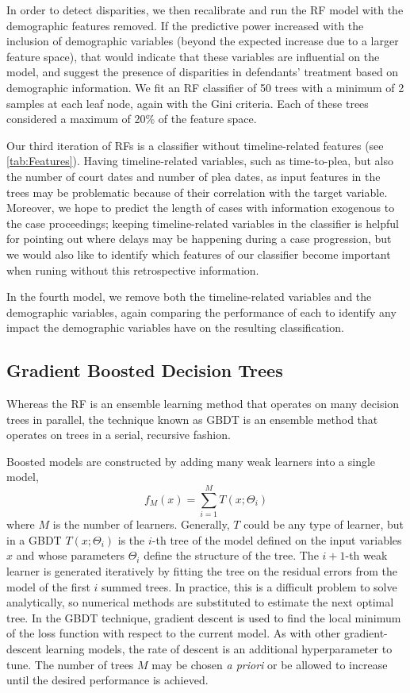 \documentclass{AISB2008}
\begin{document}
In order to detect disparities, we then recalibrate and run the RF
model with the demographic features removed. If the predictive power
increased with the inclusion of demographic variables (beyond the
expected increase due to a larger feature space), that would indicate
that these variables are influential on the model, and suggest the
presence of disparities in defendants' treatment based on demographic
information. We fit an RF classifier of 50 trees with a minimum of 2
samples at each leaf node, again with the Gini criteria. Each of these
trees considered a maximum of 20\% of the feature space.

Our third iteration of RFs is a classifier without timeline-related
features (see \autoref{tab:Features}). Having timeline-related
variables, such as time-to-plea, but also the number of court dates and
number of plea dates, as input features in the trees may be
problematic because of their correlation with the target
variable. Moreover, we hope to predict the length of cases with
information exogenous to the case proceedings; keeping
timeline-related variables in the classifier is helpful for pointing
out where delays may be happening during a case progression, but we
would also like to identify which features of our classifier become
important when runing without this retrospective information.

In the fourth model, we remove both the timeline-related variables and the
demographic variables, again comparing the performance of each to
identify any impact the demographic variables have on the resulting
classification.



\subsection{Gradient Boosted Decision Trees}

Whereas the RF is an ensemble learning method that operates on many
decision trees in parallel, the technique known as GBDT is an ensemble
method that operates on trees in a serial, recursive fashion.

Boosted models are constructed by adding many weak learners into a
single model, $$f_{M}(x) = \sum_{i=1}^{M}{T(x;\Theta_{i})}$$ where $M$
is the number of learners.  Generally, $T$ could be any type of
learner, but in a GBDT $T(x;\Theta_{i})$ is the $i$-th tree of the
model defined on the input variables $x$ and whose parameters
$\Theta_{i}$ define the structure of the tree. The $i+1$-th weak
learner is generated iteratively by fitting the tree on the residual
errors from the model of the first $i$ summed trees. In practice, this
is a difficult problem to solve analytically, so numerical methods are
substituted to estimate the next optimal tree. In the GBDT technique,
gradient descent is used to find the local minimum of the loss
function with respect to the current model. As with other
gradient-descent learning models, the rate of descent is an additional
hyperparameter to tune. The number of trees $M$ may be chosen
\textit{a priori} or be allowed to increase until the desired
performance is achieved.
\end{document}
